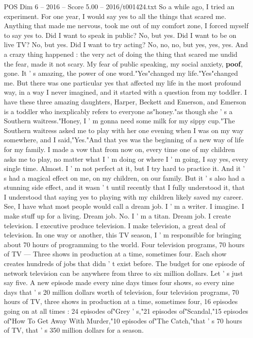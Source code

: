 \begin{textsample}{POS Dim 6 – 2016 – Score 5.00 – 2016/t001424.txt}  \label{ex:f6_pos_045}
So a while ago, I tried an experiment.
For one year, I would say yes to all the things that scared me.
Anything that made me nervous, took me out of my comfort zone, I forced myself to say yes to.
Did I want to speak in public?
No, but yes.
Did I want to be on live TV?
No, but yes.
Did I want to try acting?
No, no, no, but yes, yes, yes.
And a crazy thing happened : the very act of doing the thing that scared me undid the fear, made it not scary.
My fear of public speaking, my social anxiety, \textbf{poof}, gone.
It ' s amazing, the power of one word."Yes"changed my life."Yes"changed me.
But there was one particular yes that affected my life in the most profound way, in a way I never imagined, and it started with a question from my toddler.
I have these three amazing daughters, Harper, Beckett and Emerson, and Emerson is a toddler who inexplicably refers to everyone as"honey."as though she ' s a Southern waitress."Honey, I ' m gonna need some milk for my sippy cup."The Southern waitress asked me to play with her one evening when I was on my way somewhere, and I said,"Yes."And that yes was the beginning of a new way of life for my family.
I made a vow that from now on, every time one of my children asks me to play, no matter what I ' m doing or where I ' m going, I say yes, every single time.
Almost.
I ' m not perfect at it, but I try hard to practice it.
And it ' s had a magical effect on me, on my children, on our family.
But it ' s also had a stunning side effect, and it wasn ' t until recently that I fully understood it, that I understood that saying yes to playing with my children likely saved my career.
See, I have what most people would call a dream job.
I ' m a writer.
I imagine.
I make stuff up for a living.
Dream job.
No.
I ' m a titan.
Dream job.
I create television.
I executive produce television.
I make television, a great deal of television.
In one way or another, this TV season, I ' m responsible for bringing about 70 hours of programming to the world.
Four television programs, 70 hours of TV — Three shows in production at a time, sometimes four.
Each show creates hundreds of jobs that didn ' t exist before.
The budget for one episode of network television can be anywhere from three to six million dollars.
Let ' s just say five.
A new episode made every nine days times four shows, so every nine days that ' s 20 million dollars worth of television, four television programs, 70 hours of TV, three shows in production at a time, sometimes four, 16 episodes going on at all times : 24 episodes of"Grey ' s,"21 episodes of"Scandal,"15 episodes of"How To Get Away With Murder,"10 episodes of"The Catch,"that ' s 70 hours of TV, that ' s 350 million dollars for a season.

\end{textsample}
